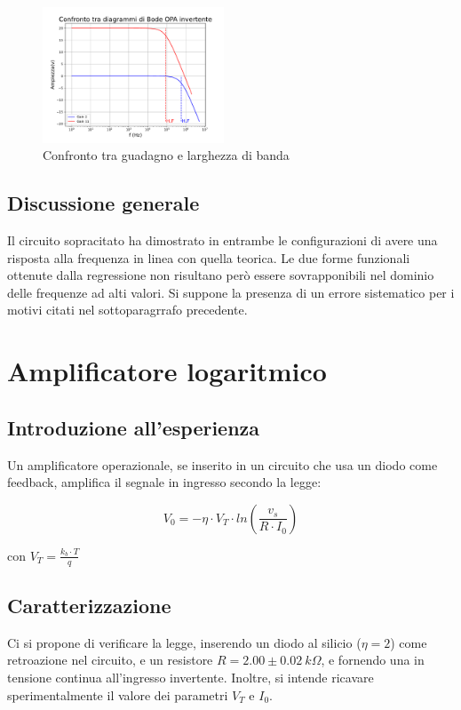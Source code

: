 \documentclass[journal]{IEEEtran}
\begin{document}
\begin{figure}[H]%
\begin {center}
\includegraphics[width=0.48\textwidth]{analysis/output/OPA-bode_gain_comparison(mag).pdf}
\caption{Confronto tra guadagno e larghezza di banda}
\label{fig:OPA-bode_gain_comparison(mag)}
\end {center}
\end{figure}
\subsection{\textbf{Discussione generale}}
Il circuito sopracitato ha dimostrato in entrambe le configurazioni di avere una risposta alla frequenza in linea con quella teorica. Le due forme funzionali ottenute dalla regressione non risultano però essere sovrapponibili nel dominio delle frequenze ad alti valori. Si suppone la presenza di un errore sistematico per i motivi citati nel sottoparagrrafo precedente.


\section{\textbf{Amplificatore logaritmico}} %
\subsection{\textbf{Introduzione all'esperienza}}
Un amplificatore operazionale, se inserito in un circuito che usa un diodo come feedback, amplifica il segnale in ingresso secondo la legge:

\begin{equation}
V_0 = - \eta \cdot V_T \cdot ln( \frac{v_s}{R \cdot I_0} )
\end{equation}

con $V_T = \frac{k_{b} \cdot T}{q}$ \\
\subsection{\textbf{Caratterizzazione}}
Ci si propone di verificare la legge, inserendo un diodo al silicio ($\eta = 2$) come retroazione nel circuito, e un resistore $R = 2.00 \pm 0.02 \ k\Omega$, e fornendo una in tensione continua all'ingresso invertente. Inoltre, si intende ricavare sperimentalmente il valore dei parametri $V_T$ e $I_0$.
\end{document}
